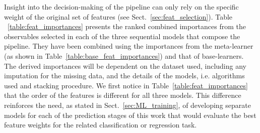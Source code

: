 \documentclass{aa}
\begin{document}
Insight into the decision-making of the pipeline can only rely on the specific weight of the original set of features (see Sect.~\ref{sec:feat_selection}). Table ~\ref{table:feat_importances} presents the ranked combined importances from the observables selected in each of the three sequential models that compose the pipeline. They have been combined using the importances from the meta-learner (as shown in Table~\ref{table:base_feat_importances}) and that of base-learners. The derived importances will be dependent on the dataset used, including any imputation for the missing data, and the details of the models, i.e. algorithms used and stacking procedure. 
We first notice in Table~\ref{table:feat_importances} that the order of the features is different for all three models. This difference reinforces the need, as stated in Sect.~\ref{sec:ML_training}, of developing separate models for each of the prediction stages of this work that would evaluate the best feature weights for the related classification or regression task. 
\end{document}
